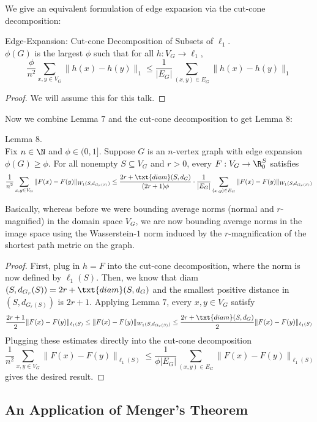 We give an equivalent formulation of edge expansion via the cut-cone decomposition:
\begin{lem} Edge-Expansion: Cut-cone Decomposition of Subsets of $\ell_1$. \\
$\phi(G)$ is the largest $\phi$ such that for all $h:V_G \to \ell_1$,
\[
\frac{\phi}{n^2}\sum_{x, y \in V_G} \|h(x) - h(y)\|_1 \leq \frac{1}{|E_G|}\sum_{(x, y) \in E_G} \|h(x) - h(y)\|_1
\]
\end{lem}
\begin{proof}
We will assume this for this talk.
\end{proof}

Now we combine Lemma $7$ and the cut-cone decomposition to get Lemma $8$:
\begin{lem} Lemma $8$. \\
Fix $n \in \N$ and $\phi \in (0, 1]$. Suppose $G$ is an $n$-vertex graph with edge expansion $\phi(G) \geq \phi$. For all nonempty $S \subseteq V_G$ and $r > 0$, every $F:V_G \to \R_0^S$ satisfies
\[
\frac{1}{n^2}\sum_{x, y \in V_G} \|F(x) - F(y)\|_{W_1(S, d_{G_r(S)})} \leq \frac{2r + \txt{diam}(S, d_G)}{(2r + 1)\phi} \cdot \frac{1}{|E_G|} \sum_{(x, y) \in E_G}\|F(x) - F(y)\|_{W_1(S, d_{G_r(S)})}
\]
\end{lem}
Basically, whereas before we were bounding average norms (normal and $r$-magnified) in the domain space $V_G$, we are now bounding average norms in the image space using the Wasserstein-$1$ norm induced by the $r$-magnification of the shortest path metric on the graph.
\begin{proof}
First, plug in $h = F$ into the cut-cone decomposition, where the norm is now defined by $\ell_1(S)$. Then, we know that diam$(S, d_{G_r}(S)) = 2r + \txt{diam}(S, d_G)$ and the smallest positive distance in $(S, d_{G_r(S)})$ is $2r + 1$. Applying Lemma $7$, every $x, y \in V_G$ satisfy
\[
\frac{2r + 1}{2}\|F(x) - F(y)\|_{\ell_1(S)} \leq \|F(x) - F(y)\|_{W_1(S, d_{G_r(S)})} \leq \frac{2r + \txt{diam}(S, d_G)}{2}\|F(x) - F(y)\|_{\ell_1(S)}
\]
Plugging these estimates directly into the cut-cone decomposition
\[
\frac{1}{n^2}\sum_{x, y \in V_G} \|F(x) - F(y)\|_{\ell_1(S)} \leq \frac{1}{\phi|E_G|}\sum_{(x, y) \in E_G} \|F(x) - F(y)\|_{\ell_1(S)}
\]
gives the desired result.
\end{proof}

\subsection{An Application of Menger's Theorem}

